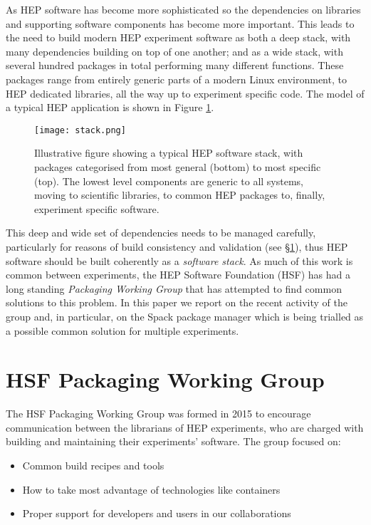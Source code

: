 \documentclass{webofc}
\begin{document}
As HEP software has become more sophisticated so the dependencies on libraries
and supporting software components has become more important. This leads to the
need to build modern HEP experiment software as both a deep stack, with many
dependencies building on top of one another; and as a wide stack, with several
hundred packages in total performing many different functions.
These packages range from entirely generic
parts of a modern Linux environment, to HEP dedicated libraries, all the way up to
experiment specific code. The model of a typical HEP application is shown in
Figure \ref{fig:stack}.

\begin{figure}[h]
\centering
\texttt{[image: stack.png]}
\caption{Illustrative figure showing a typical HEP software stack, with packages
categorised from most general (bottom) to most specific (top). The lowest level
components are generic to all systems, moving to scientific libraries, to common
HEP packages to, finally, experiment specific software.}
\label{fig:stack}
\end{figure}

This deep and wide set of dependencies needs to be managed carefully,
particularly for reasons of build consistency and validation (see \S\ref{hsfpwg}), thus HEP
software should be built coherently as a \emph{software stack}. As much of
this work is common between experiments, the HEP Software Foundation (HSF) has
had a long standing \emph{Packaging Working Group}\cite{HSFPWG} that has attempted to find
common solutions to this problem. In this paper we report on the recent activity
of the group and, in particular, on the Spack package manager\cite{10.1145/2807591.2807623} which is being
trialled as a possible common solution for multiple experiments.

\section{HSF Packaging Working Group}
\label{hsfpwg}

The HSF Packaging Working Group\cite{HSFPWG} was formed in 2015 to encourage communication
between the librarians of HEP experiments, who are charged with building and
maintaining their experiments' software. The group focused on:

\begin{itemize}
    \item Common build recipes and tools
    \item How to take most advantage of technologies like containers
    \item Proper support for developers and users in our collaborations
\end{itemize}
\end{document}
